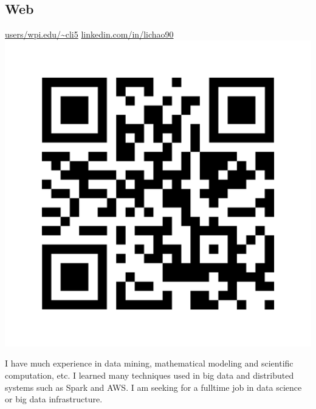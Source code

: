 \documentclass[]{friggeri-cv}
\begin{document}
\begin{aside}
	\section{Web}
	\href{http://users.wpi.edu/~cli5}{users/wpi.edu/\textasciitilde cli5}
	\href{https://www.linkedin.com/in/lichao90}{linkedin.com/in/lichao90}
	\includegraphics[scale=0.05]{img/Chao_Li.png}
\end{aside}

I have much experience in data mining, mathematical modeling and scientific
computation, etc. I learned many techniques used in big data and distributed
systems such as Spark and AWS. I am seeking for a fulltime job in data science
or big data infrastructure. 
\end{document}
